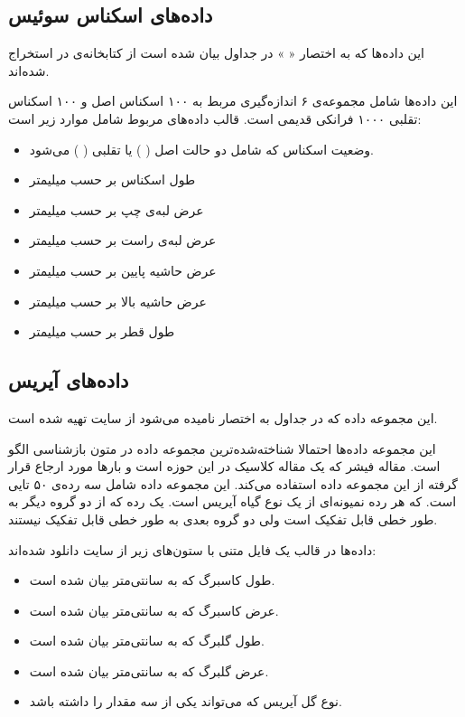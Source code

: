 \subsection{
داده‌های اسکناس سوئیس
}
\label{sec:Swiss}

این داده‌ها که به اختصار «
» در جداول بیان شده است از کتابخانه‌ی 
\cite{rmclust}
در 
استخراج شده‌اند.

این داده‌ها شامل مجموعه‌ی ۶ اندازه‌گیری مربط به ۱۰۰ اسکناس اصل و ۱۰۰ اسکناس تقلبی ۱۰۰۰ فرانکی قدیمی است. قالب داده‌های مربوط شامل موارد زیر است:

\begin{itemize}
\item
{}
وضعیت اسکناس که شامل دو حالت اصل (%
%
)
یا تقلبی (%
%
) می‌شود.
\item
{}
طول اسکناس بر حسب میلیمتر
\item
{}
عرض لبه‌ی چپ بر حسب میلیمتر
\item
{}
عرض لبه‌ی راست بر حسب میلیمتر
\item
{}
عرض حاشیه پایین بر حسب میلیمتر
\item
{}
عرض حاشیه بالا بر حسب میلیمتر
\item
{}
طول قطر بر حسب میلیمتر
\end{itemize}

\subsection{
داده‌های آیریس
}
\label{sec:Iris}


این مجموعه داده که در جداول به اختصار 
نامیده می‌شود از سایت 
\cite{uci_iris}
تهیه شده است.

این مجموعه داده‌ها احتمالا شناخته‌شده‌ترین مجموعه داده در متون بازشناسی الگو%
است. مقاله فیشر%
\cite{fisher1936use}
 که یک مقاله کلاسیک در این حوزه است و بارها مورد ارجاع قرار گرفته از این مجموعه داده استفاده می‌کند. این مجموعه داده شامل سه رده‌ی ۵۰ تایی است. که هر رده نمیونه‌ای از یک نوع گیاه آیریس است. یک رده که از دو گروه دیگر به طور خطی قابل تفکیک است ولی دو گروه بعدی به طور خطی قابل تفکیک نیستند.

داده‌ها در قالب یک فایل متنی با ستون‌های زیر از سایت 
دانلود شده‌اند:

\begin{itemize}
\item
{}
طول کاسبرگ که به سانتی‌متر بیان شده است.
\item
{}
عرض کاسبرگ که به سانتی‌متر بیان شده است.
\item
{}
طول گلبرگ که به سانتی‌متر بیان شده است.
\item
{}
عرض گلبرگ که به سانتی‌متر بیان شده است.
\item
{}
نوع گل آیریس که می‌تواند یکی از سه مقدار 
را داشته باشد.
\end{itemize}


